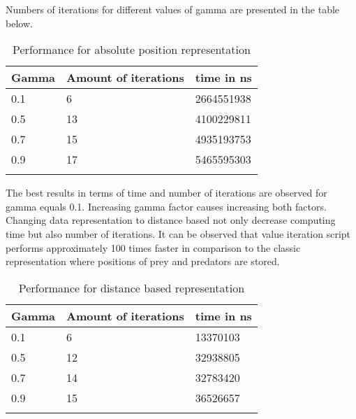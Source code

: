 Numbers of iterations for different values of gamma are presented in the table below. 

\begin{longtable}{| p{} | p{} | p{} |} 
   Gamma & Amount of iterations & time in ns \\
    \hline
0.1 & 6 &   2664551938 \\
0.5 & 13 & 4100229811\\
0.7 & 15 & 4935193753\\
0.9 &17 &  5465595303\\
\caption{Performance for absolute position representation} 
\label{tab:myfirstlongtable}
\end{longtable}

The best results in terms of time and number of iterations are observed for gamma equals 0.1. Increasing gamma factor causes increasing both factors. Changing data representation to distance based not only decrease computing time but also number of iterations. It can be observed that value iteration script performs approximately 100 times faster in comparison to the classic representation where positions of prey and predators are stored.

\begin{longtable}{| p{} | p{} | p{} |} 
   Gamma & Amount of iterations & time in ns \\
    \hline
0.1 & 6 & 13370103 \\
0.5 & 12 &32938805\\
0.7 & 14 &32783420\\
0.9 &15 & 36526657\\
\caption{Performance for distance based representation} 
\label{tab:myfirstlongtable}
\end{longtable}



